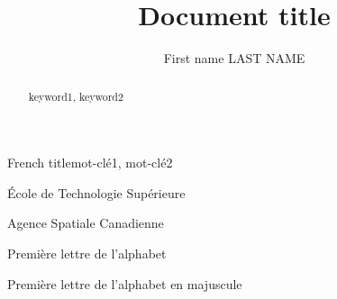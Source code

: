 \documentclass[letterpaper%
, twoside%
, 12pt%
,these%
, english%
,creativecommons,hyperref, withAlgo2e %
]{thETS}
\title{Document title}
\author{First name LAST NAME}
\begin{document}

\maketitle

\presentjury

\begin{foreword}

\lipsum[1] %

\end{foreword}



\begin{acknowledgements}

\lipsum[1] %


\end{acknowledgements}



\begin{summary}{French title}{mot-clé1, mot-clé2}

\lipsum[1] %

\end{summary}


\begin{abstract}{keyword1, keyword2}

\lipsum[1] %

\end{abstract}


\tableofcontents


\listoftables


\listoffigures

\listofalgorithms


\begin{listofabbr}[3cm]
\item [ETS] École de Technologie Supérieure
\item [ASC] Agence Spatiale Canadienne
\end{listofabbr}


\begin{listofsymbols}[3cm]
\item [a] Première lettre de l'alphabet
\item [A] Première lettre de l'alphabet en majuscule
\end{listofsymbols}
\end{document}
